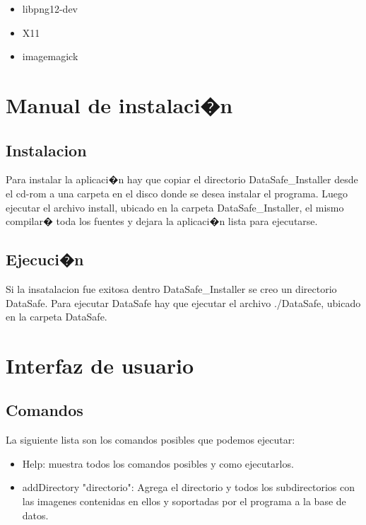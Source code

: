 \documentclass[12pt]{article}
\numberwithin{equation}{section}
\numberwithin{figure}{section}
\numberwithin{table}{section}
\begin{document}
\begin{itemize}
 \item libpng12-dev
\end{itemize}

\begin{itemize}
 \item X11
\end{itemize}

\begin{itemize}
 \item imagemagick
\end{itemize}

\section{Manual de instalaci�n}
\subsection{Instalacion}
Para instalar la aplicaci�n hay que copiar el directorio DataSafe_Installer desde el cd-rom a una carpeta en el disco donde se desea instalar el programa. Luego ejecutar el archivo install, ubicado en la carpeta DataSafe_Installer, el mismo compilar� toda los fuentes y dejara la aplicaci�n lista para ejecutarse.
\subsection{Ejecuci�n}
Si la insatalacion fue exitosa dentro DataSafe_Installer se creo un directorio DataSafe. Para ejecutar DataSafe hay que ejecutar el archivo ./DataSafe, ubicado en la carpeta DataSafe.

\section{Interfaz de usuario}

\subsection{Comandos}
La siguiente lista son los comandos posibles que podemos ejecutar:

\begin{itemize}
 \item Help: muestra todos los comandos posibles y como ejecutarlos.
\end{itemize}

\begin{itemize}
 \item addDirectory "directorio": Agrega el directorio y todos los subdirectorios con las imagenes contenidas en ellos y soportadas por el programa a la base de datos.
\end{itemize}
\end{document}
